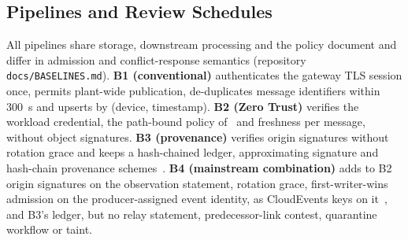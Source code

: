 \subsection{Pipelines and Review Schedules}\label{sec:pipelines}

All pipelines share storage, downstream processing and the policy document and differ in admission and conflict-response semantics (repository \texttt{docs/BASELINES.md}). \textbf{B1 (conventional)} authenticates the gateway TLS session once, permits plant-wide publication, de-duplicates message identifiers within 300~s and upserts by (device, timestamp). \textbf{B2 (Zero Trust)} verifies the workload credential, the path-bound policy of \sys\ and freshness per message, without object signatures. \textbf{B3 (provenance)} verifies origin signatures without rotation grace and keeps a hash-chained ledger, approximating signature and hash-chain provenance schemes~\cite{hasan2009tos,javaid2018blockpro,sigwart2019bcprov}. \textbf{B4 (mainstream combination)} adds to B2 origin signatures on the observation statement, rotation grace, first-writer-wins admission on the producer-assigned event identity, as CloudEvents keys on it~\cite{cloudevents102}, and B3's ledger, but no relay statement, predecessor-link contest, quarantine workflow or taint.

